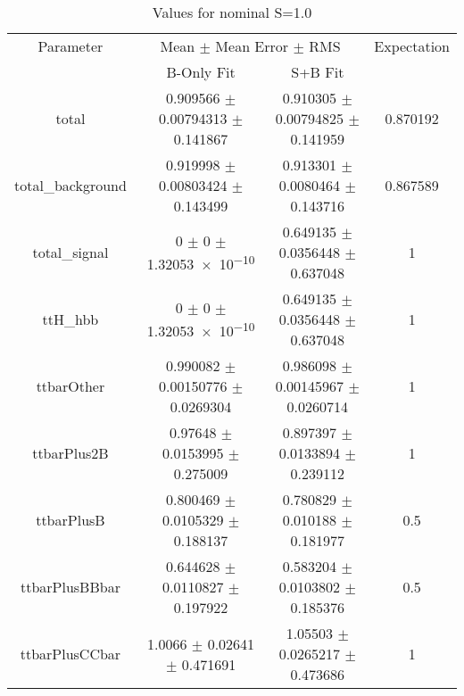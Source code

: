 \begin{table}
\centering
\caption{Values for nominal S=1.0}
\begin{tabular}{cccc}
\toprule
Parameter & \multicolumn{2}{c}{Mean $\pm$ Mean Error $\pm$ RMS} & Expectation\\
 & B-Only Fit & S+B Fit & \\
\midrule
total & \num{0.909566} $\pm$ \num{0.00794313} $\pm$ \num{0.141867} & \num{0.910305} $\pm$ \num{0.00794825} $\pm$ \num{0.141959} & \num{0.870192}\\
total\_background & \num{0.919998} $\pm$ \num{0.00803424} $\pm$ \num{0.143499} & \num{0.913301} $\pm$ \num{0.0080464} $\pm$ \num{0.143716} & \num{0.867589}\\
total\_signal & \num{0} $\pm$ \num{0} $\pm$ \num{1.32053e-10} & \num{0.649135} $\pm$ \num{0.0356448} $\pm$ \num{0.637048} & \num{1}\\
ttH\_hbb & \num{0} $\pm$ \num{0} $\pm$ \num{1.32053e-10} & \num{0.649135} $\pm$ \num{0.0356448} $\pm$ \num{0.637048} & \num{1}\\
ttbarOther & \num{0.990082} $\pm$ \num{0.00150776} $\pm$ \num{0.0269304} & \num{0.986098} $\pm$ \num{0.00145967} $\pm$ \num{0.0260714} & \num{1}\\
ttbarPlus2B & \num{0.97648} $\pm$ \num{0.0153995} $\pm$ \num{0.275009} & \num{0.897397} $\pm$ \num{0.0133894} $\pm$ \num{0.239112} & \num{1}\\
ttbarPlusB & \num{0.800469} $\pm$ \num{0.0105329} $\pm$ \num{0.188137} & \num{0.780829} $\pm$ \num{0.010188} $\pm$ \num{0.181977} & \num{0.5}\\
ttbarPlusBBbar & \num{0.644628} $\pm$ \num{0.0110827} $\pm$ \num{0.197922} & \num{0.583204} $\pm$ \num{0.0103802} $\pm$ \num{0.185376} & \num{0.5}\\
ttbarPlusCCbar & \num{1.0066} $\pm$ \num{0.02641} $\pm$ \num{0.471691} & \num{1.05503} $\pm$ \num{0.0265217} $\pm$ \num{0.473686} & \num{1}\\
\bottomrule
\end{tabular}
\end{table}